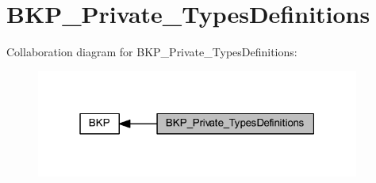\hypertarget{group___b_k_p___private___types_definitions}{}\section{B\+K\+P\+\_\+\+Private\+\_\+\+Types\+Definitions}
\label{group___b_k_p___private___types_definitions}
Collaboration diagram for B\+K\+P\+\_\+\+Private\+\_\+\+Types\+Definitions\+:
\nopagebreak
\begin{figure}[H]
\begin{center}
\leavevmode
\includegraphics[width=301pt]{group___b_k_p___private___types_definitions}
\end{center}
\end{figure}
